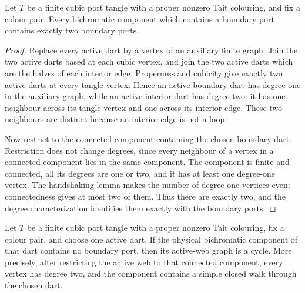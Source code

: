 \begin{theorem}
\label{thm:port-tangle-kempe-two-ended}
Let $T$ be a finite cubic port tangle with a proper nonzero Tait colouring,
and fix a colour pair.  Every bichromatic component which contains a boundary
port contains exactly two boundary ports.
\end{theorem}

\begin{proof}
Replace every active dart by a vertex of an auxiliary finite graph.  Join the
two active darts based at each cubic vertex, and join the two active darts
which are the halves of each interior edge.  Properness and cubicity give
exactly two active darts at every tangle vertex.  Hence an active boundary
dart has degree one in the auxiliary graph, while an active interior dart has
degree two: it has one neighbour across its tangle vertex and one across its
interior edge.  These two neighbours are distinct because an interior edge is
not a loop.

Now restrict to the connected component containing the chosen boundary dart.
Restriction does not change degrees, since every neighbour of a vertex in a
connected component lies in the same component.  The component is finite and
connected, all its degrees are one or two, and it has at least one degree-one
vertex.  The handshaking lemma makes the number of degree-one vertices even;
connectedness gives at most two of them.  Thus there are exactly two, and the
degree characterization identifies them exactly with the boundary ports.
\end{proof}

\begin{lemma}
\label{lem:port-tangle-kempe-boundary-free-cycle}
Let $T$ be a finite cubic port tangle with a proper nonzero Tait colouring,
fix a colour pair, and choose one active dart.  If the physical bichromatic
component of that dart contains no boundary port, then its active-web graph
is a cycle.  More precisely, after restricting the active web to that
connected component, every vertex has degree two, and the component contains
a simple closed walk through the chosen dart.
\end{lemma}

